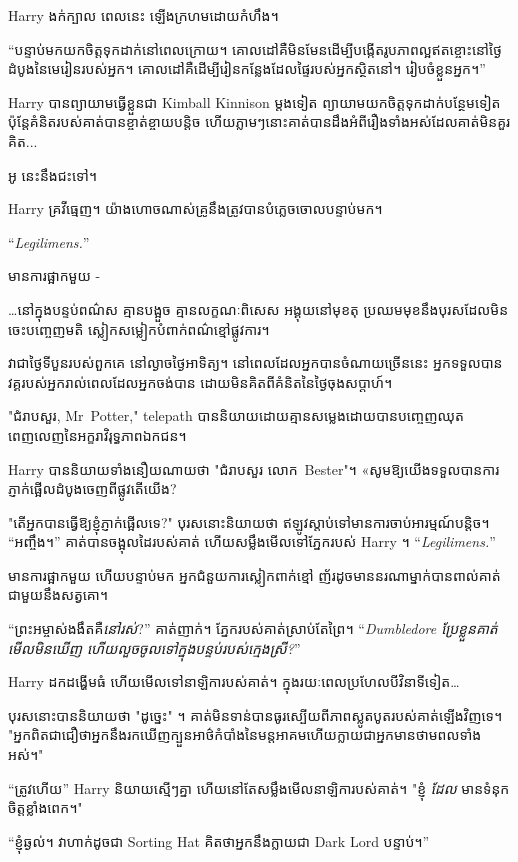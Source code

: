 {Harry ងក់ក្បាល ពេលនេះ ឡើងក្រហមដោយកំហឹង។

“បន្ទាប់មកយកចិត្តទុកដាក់នៅពេលក្រោយ។ គោលដៅគឺមិនមែនដើម្បីបង្កើតរូបភាពល្អឥតខ្ចោះនៅថ្ងៃដំបូងនៃមេរៀនរបស់អ្នក។ គោលដៅគឺដើម្បីរៀនកន្លែងដែលផ្ទៃរបស់អ្នកស្ថិតនៅ។ រៀបចំខ្លួនអ្នក។”

Harry បានព្យាយាមធ្វើខ្លួនជា Kimball Kinnison ម្តងទៀត ព្យាយាមយកចិត្តទុកដាក់បន្ថែមទៀត ប៉ុន្តែគំនិតរបស់គាត់បានខ្ចាត់ខ្ចាយបន្តិច ហើយភ្លាមៗនោះគាត់បានដឹងអំពីរឿងទាំងអស់ដែលគាត់មិនគួរគិត...

អូ នេះ​នឹង​ជះ​ទៅ។

Harry គ្រវីធ្មេញ។ យ៉ាង​ហោច​ណាស់​គ្រូ​នឹង​ត្រូវ​បាន​បំភ្លេច​ចោល​បន្ទាប់​មក។

“\emph{Legilimens.}”

មានការផ្អាកមួយ -

\later

…នៅក្នុងបន្ទប់ពណ៌ស គ្មានបង្អួច គ្មានលក្ខណៈពិសេស អង្គុយនៅមុខតុ ប្រឈមមុខនឹងបុរសដែលមិនចេះបញ្ចេញមតិ ស្លៀកសម្លៀកបំពាក់ពណ៌ខ្មៅផ្លូវការ។

វាជាថ្ងៃទីបួនរបស់ពួកគេ នៅល្ងាចថ្ងៃអាទិត្យ។ នៅពេលដែលអ្នកបានចំណាយច្រើននេះ អ្នកទទួលបានវគ្គរបស់អ្នករាល់ពេលដែលអ្នកចង់បាន ដោយមិនគិតពីគំនិតនៃថ្ងៃចុងសប្តាហ៍។

"ជំរាបសួរ, Mr~Potter," telepath បាននិយាយដោយគ្មានសម្លេងដោយបានបញ្ចេញឈុតពេញលេញនៃអក្ខរាវិរុទ្ធភាពឯកជន។

Harry បាននិយាយទាំងនឿយណាយថា "ជំរាបសួរ លោក~Bester"។ «សូម​ឱ្យ​យើង​ទទួល​បាន​ការ​ភ្ញាក់​ផ្អើល​ដំបូង​ចេញ​ពី​ផ្លូវ​តើ​យើង​?

"តើអ្នកបានធ្វើឱ្យខ្ញុំភ្ញាក់ផ្អើលទេ?" បុរស​នោះ​និយាយ​ថា ឥឡូវ​ស្តាប់​ទៅ​មាន​ការ​ចាប់​អារម្មណ៍​បន្តិច។ “អញ្ចឹង។” គាត់បានចង្អុលដៃរបស់គាត់ ហើយសម្លឹងមើលទៅភ្នែករបស់ Harry ។ “\emph{Legilimens.}”

មានការផ្អាកមួយ ហើយបន្ទាប់មក អ្នកជំនួយការស្លៀកពាក់ខ្មៅ ញ័រដូចមាននរណាម្នាក់បានពាល់គាត់ជាមួយនឹងសត្វគោ។

“ព្រះអម្ចាស់ងងឹតគឺ\emph{នៅរស់}?” គាត់ញាក់។ ភ្នែករបស់គាត់ស្រាប់តែព្រៃ។ “\emph{Dumbledore ប្រែខ្លួនគាត់មើលមិនឃើញ ហើយលួចចូលទៅក្នុងបន្ទប់របស់ក្មេងស្រី?}”

Harry ដកដង្ហើមធំ ហើយមើលទៅនាឡិការបស់គាត់។ ក្នុងរយៈពេលប្រហែលបីវិនាទីទៀត…

បុរសនោះបាននិយាយថា "ដូច្នេះ" ។ គាត់មិនទាន់បានធូរស្បើយពីភាពស្លូតបូតរបស់គាត់ឡើងវិញទេ។ "អ្នកពិតជាជឿថាអ្នកនឹងរកឃើញក្បួនអាថ៌កំបាំងនៃមន្តអាគមហើយក្លាយជាអ្នកមានថាមពលទាំងអស់។"

“ត្រូវហើយ” Harry និយាយស្មើៗគ្នា ហើយនៅតែសម្លឹងមើលនាឡិការបស់គាត់។ "ខ្ញុំ \emph{ដែល} មានទំនុកចិត្តខ្លាំងពេក។"

“ខ្ញុំឆ្ងល់។ វាហាក់ដូចជា Sorting Hat គិតថាអ្នកនឹងក្លាយជា Dark Lord បន្ទាប់។”

}

